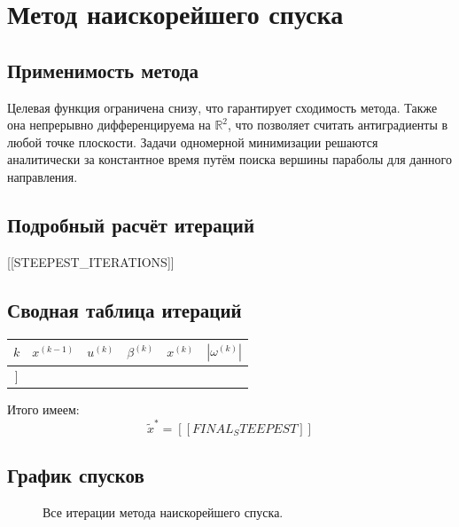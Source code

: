 \documentclass[12pt]{article}
\begin{document}
\newpage

\section{Метод наискорейшего спуска}

\subsection{Применимость метода}

Целевая функция ограничена снизу, что гарантирует сходимость метода. Также она непрерывно дифференцируема на \( \mathbb{R}^2 \), что позволяет считать антиградиенты в любой точке плоскости. Задачи одномерной минимизации решаются аналитически за константное время путём поиска вершины параболы для данного направления.

\subsection{Подробный расчёт итераций}
[[STEEPEST_ITERATIONS]]

\subsection{Сводная таблица итераций}
\begin{table}[H]
\centering
\begin{tabular}{|c|c|c|c|c|c|}
\hline
$k$ & $x^{(k-1)}$ & $u^{(k)}$ & $\beta^{(k)}$ & $x^{(k)}$ & $|\omega^{(k)}|$ \\
\hline
[[STEEPEST_TABLE]]
\end{tabular}
\end{table}

Итого имеем:
\[
  \tilde{x}^{\ast}=[[FINAL_STEEPEST]]
\]

\subsection{График спусков}

\begin{figure}[H]
  \centering
  \caption{Все итерации метода наискорейшего спуска.}
  \end{figure}
\end{document}
